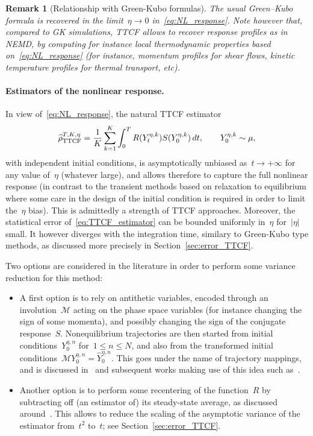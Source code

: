 \documentclass[11pt]{article}
\renewcommand{\leq}{\leqslant}
\newtheorem{remark}{Remark}
\theoremstyle{definition}
\let\oldparagraph=\paragraph
\renewcommand\paragraph[1]{\oldparagraph{#1.}}
\newcommand{\TestTTCF}{\estTmp^{T,K,\eta}_{\rm TTCF}}
\newcommand{\estTmp}{\widehat{\rho}}
\begin{document}
\begin{remark}[Relationship with Green-Kubo formulas]
  The usual Green--Kubo formula is recovered in the limit~$\eta \to 0$ in~\eqref{eq:NL_response}. Note however that, compared to GK simulations, TTCF allows to recover response profiles as in NEMD, by computing for instance local thermodynamic properties based on~\eqref{eq:NL_response} (for instance, momentum profiles for shear flows, kinetic temperature profiles for thermal transport, etc).
\end{remark}

\paragraph{Estimators of the nonlinear response}

In view of~\eqref{eq:NL_response}, the natural TTCF estimator
\begin{equation}
  \label{eq:TTCF_estimator}
  \TestTTCF = \frac{1}{K} \sum_{k=1}^K \int_0^T R(Y_t^{\eta,k}) S(Y_0^{\eta,k}) \, dt, \qquad Y_0^{\eta,k} \sim \mu,
\end{equation}
with independent initial conditions, is asymptotically unbiased as~$t \to +\infty$ for any value of~$\eta$ (whatever large), and allows therefore to capture the full nonlinear response (in contrast to the transient methods based on relaxation to equilibrium where some care in the design of the initial condition is required in order to limit the~$\eta$ bias). This is admittedly a strength of TTCF approaches. Moreover, the statistical error of~\eqref{eq:TTCF_estimator} can be bounded uniformly in~$\eta$ for~$|\eta|$ small. It however diverges with the integration time, similary to Green-Kubo type methods, as discussed more precisely in Section~\ref{sec:error_TTCF}.

Two options are considered in the literature in order to perform some variance reduction for this method:
\begin{itemize}
\item A first option is to rely on antithetic variables, encoded through an involution~$\mathscr{M}$ acting on the phase space variables (for instance changing the sign of some momenta), and possibly changing the sign of the conjugate response~$S$. Nonequilibrium trajectories are then started from initial conditions~$Y_0^{\eta,n}$ for~$1 \leq n \leq N$, and also from the transformed initial conditions~$\mathscr{M}Y_0^{\eta,n} = \widehat{Y}_0^{\eta,n}$. This goes under the name of trajectory mappings, and is discussed in~\cite[Section~7.4]{evans2007} and subsequent works making use of this idea such as~\cite{delhommelle2005, maffioli2022, maffioli2024}.
\item Another option is to perform some recentering of the function~$R$ by subtracting off (an estimator of) its steady-state average, as discussed around~\cite[Eq.~(3)]{maffioli2024}. This allows to reduce the scaling of the asymptotic variance of the estimator from~$t^2$ to~$t$; see Section~\ref{sec:error_TTCF}.  
\end{itemize}
\end{document}
